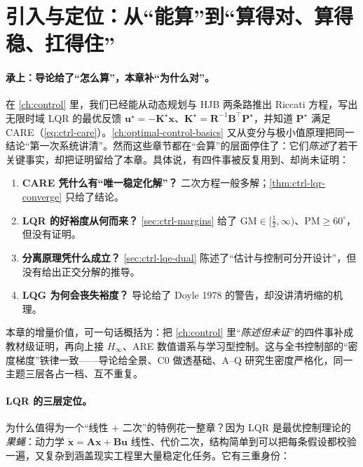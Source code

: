 \section{引入与定位：从“能算”到“算得对、算得稳、扛得住”}
\label{sec:lqr-deep-intro}

\paragraph{承上：导论给了“怎么算”，本章补“为什么对”。}
在 \cref{ch:control} 里，我们已经能从动态规划与 HJB 两条路推出 Riccati 方程，写出无限时域 LQR 的最优反馈 $\mathbf u^\star=-\mathbf K^\star\mathbf x$、$\mathbf K^\star=\mathbf R^{-1}\mathbf B^\top\mathbf P^\star$，并知道 $\mathbf P^\star$ 满足 CARE（\cref{eq:ctrl-care}）。\cref{ch:optimal-control-basics} 又从变分与极小值原理把同一结论“第一次系统讲清”。然而这些章节都在“会算”的层面停住了：它们\emph{陈述}了若干关键事实，却把证明留给了本章。具体说，有四件事被反复用到、却尚未证明：

\begin{enumerate}
  \item \textbf{CARE 凭什么有“唯一稳定化解”？} 二次方程一般多解；\cref{thm:ctrl-lqr-converge} 只给了结论。
  \item \textbf{LQR 的好裕度从何而来？} \cref{sec:ctrl-margins} 给了 $\mathrm{GM}\in[\tfrac12,\infty)$、$\mathrm{PM}\ge60^\circ$，但没有证明。
  \item \textbf{分离原理凭什么成立？} \cref{sec:ctrl-lqe-dual} 陈述了“估计与控制可分开设计”，但没有给出正交分解的推导。
  \item \textbf{LQG 为何会丧失裕度？} 导论给了 Doyle 1978 的警告，却没讲清坍缩的机理。
\end{enumerate}

\begin{insight}
本章的增量价值，可一句话概括为：把 \cref{ch:control} 里“\emph{陈述但未证}”的四件事补成教材级证明，再向上接 $H_\infty$、ARE 数值谱系与学习型控制。这与全书控制部的“密度梯度”铁律一致——导论给全景、C0 做透基础、A--Q 研究生密度严格化，同一主题三层各占一档、互不重复。
\end{insight}

\paragraph{LQR 的三层定位。}
为什么值得为一个“线性 $+$ 二次”的特例花一整章？因为 LQR 是最优控制理论的\emph{果蝇}\cite{tedrake_underactuated}：动力学 $\dot{\mathbf x}=\mathbf A\mathbf x+\mathbf B\mathbf u$ 线性、代价二次，结构简单到可以把每条假设都校验一遍，又复杂到涵盖现实工程里大量稳定化任务。它有三重身份：

